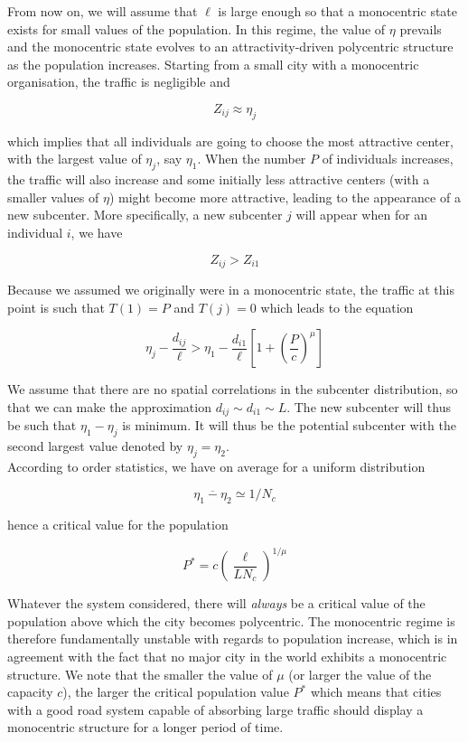 From now on, we will assume that $\ell$ is large enough so that a
monocentric state exists for small values of the population. In this
regime, the value of $\eta$ prevails and the monocentric state evolves
to an attractivity-driven polycentric structure as the population
increases. 
Starting from a small city with a monocentric
organisation, the traffic is negligible and 

$$Z_{ij}\approx \eta_j$$

which implies that all individuals are going to choose the most attractive
center, with the largest value of $\eta_j$, say $\eta_1$.
When the number $P$ of individuals increases, the traffic will also increase and
some initially less attractive centers (with a smaller values of $\eta$) might
become more attractive, leading to the appearance of a new subcenter. More specifically, a new
subcenter $j$ will appear when for an individual $i$, we have 

$$Z_{ij}>Z_{i1}$$

Because we assumed we originally were in a monocentric state, the traffic at
this point is such that $T(1)=P$ and $T(j)=0$ which leads to the equation

\begin{equation}
    \eta_j-\frac{d_{ij}}{\ell}>\eta_1-\frac{d_{i1}}{\ell}\left[1+\left(\frac{P}{c}\right)^\mu\right]
\end{equation}

We assume that there are no spatial correlations in the subcenter distribution,
so that we can make the approximation $d_{ij}\sim d_{i1}\sim L$. The new
subcenter will thus be such that $\eta_1-\eta_j$ is minimum. It will thus be the
potential subcenter with the second largest value denoted by $\eta_j=\eta_2$.\\

According to order statistics, we have on average for a uniform distribution

$$\overline{\eta_1-\eta_2}\simeq 1/N_c$$

hence a critical value for the population

\begin{equation}
    \boxed{P^*= c \left( \frac{\ell}{L N_c} \right)^{1/\mu}}
    \label{eq:critical_population}
\end{equation}

Whatever the system considered, there will \emph{always} be a critical
value of the population above which the city becomes polycentric. The
monocentric regime is therefore fundamentally unstable with regards to
population increase, which is in agreement with the fact that no major city in
the world exhibits a monocentric structure. We note that the smaller the value
of $\mu$ (or larger the value of the capacity $c$), the larger the critical
population value $P^*$ which means that cities with a good road system capable
of absorbing large traffic should display a monocentric structure for a longer
period of time.

